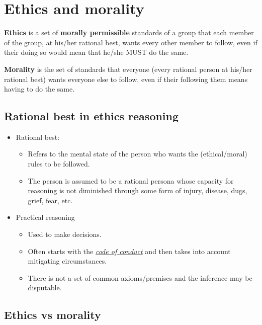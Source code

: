 \documentclass{article}
\newcommand{\worddef}[1]{\hyperref[sec:reference]{\textit{#1}}}
\begin{document}
\section{Ethics and morality}
\begin{flushleft}
\textbf{Ethics} is a set of \textbf{morally permissible} standards of a group that each member of the group, at his/her rational best, wants every other member to follow, even if their doing so would mean that he/she MUST do the same.

\bigskip

\textbf{Morality} is the set of standards that everyone (every rational person at his/her rational best) wants everyone else to follow, even if their following them means having to do the same.
\end{flushleft}

\subsection{Rational best in ethics reasoning}
\begin{itemize}
  \item Rational best:
  \begin{itemize}
    \item Refers to the mental state of the person who wants the (ethical/moral) rules to be followed.
    \item The person is assumed to be a rational persona whose capacity for reasoning is
not diminished through some form of injury, disease, dugs, grief, fear, etc. 
  \end{itemize}
  \item Practical reasoning
  \begin{itemize}
    \item Used to make decisions.
    \item Often starts with the \worddef{code of conduct} and then takes into account mitigating circumstances.
    \item There is not a set of common axioms/premises and the inference may be disputable.  
  \end{itemize}
\end{itemize}

\subsection{Ethics vs morality}
\end{document}

